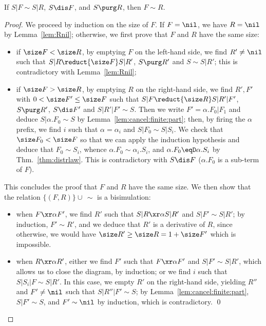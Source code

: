 \documentclass{llncs}
\begin{document}
\begin{lem}\label{lem:cancel:FR}
  If $S|F\sim S|R$, $S\dis F$, and $S\purg R$, then $F\sim R$.
\end{lem}
\begin{proof}
  We proceed by induction on the size of $F$. If $F=\nil$, we have
  $R=\nil$ by Lemma~\ref{lem:Rnil}; otherwise, we first prove that $F$
  and $R$ have the same size:
  \begin{itemize}
  \item if $\size F < \size R$, by emptying $F$ on the left-hand side,
    we find $R'\neq\nil$ such that $S|R\reduct{\size F} S|R'$, $S\purg
    R'$ and $S\sim S|R'$; this is contradictory with
    Lemma~\ref{lem:Rnil};
  \item if $\size F > \size R$, by emptying $R$ on the right-hand
    side, we find $R',F'$ with $0<\size F'\leq\size F$ such that
    $S|F\reduct{\size R} S|R'|F'$, $S\purg R'$, $S\dis F'$ and
    $S|R'|F'\sim S$. Then we write $F'=\alpha.F_0|F_1$ and deduce
    $S|\alpha.F_0\sim S$ by Lemma~\ref{lem:cancel:finite:part}; then,
    by firing the $\alpha$ prefix, we find $i$ such that
    $\alpha=\alpha_i$ and $S|F_0\sim S|S_i$. We check that $\size
    F_0<\size F$ so that we can apply the induction hypothesis and
    deduce that $F_0\sim S_i$, whence $\alpha.F_0\sim \alpha_i.S_i$,
    and $\alpha.F_0\eqD \alpha.S_i$ by Thm.~\ref{thm:distrlaw}. This
    is contradictory with $S\dis F$ ($\alpha.F_0$ is a sub-term of
    $F$). 
  \end{itemize}
  This concludes the proof that $F$ and $R$ have the same size. We
  then show that the relation $\{(F,R)\}\cup\,\sim$ is a bisimulation:
  \begin{itemize}
  \item when $F\xr\alpha F'$, we find $R'$ such that $S|R\xr\alpha
    S|R'$ and $S|F'\sim S|R'$; by induction, $F'\sim R'$, and we
    deduce that $R'$ is a derivative of $R$, since otherwise, we would
    have $\size R'\geq \size R=1+\size F'$ which is impossible.
  \item when $R\xr\alpha R'$, either we find $F'$ such that
    $F\xr\alpha F'$ and $S|F'\sim S|R'$, which allows us to close the
    diagram, by induction; or we find $i$ such that $S|S_i|F\sim
    S|R'$. In this case, we empty $R'$ on the right-hand side,
    yielding $R''$ and $F'\neq\nil$ such that $S|R''|F'\sim S$; by
    Lemma~\ref{lem:cancel:finite:part}, $S|F'\sim S$, and $F'\sim\nil$
    by induction, which is contradictory. \qed
  \end{itemize}
\end{proof}
\end{document}
